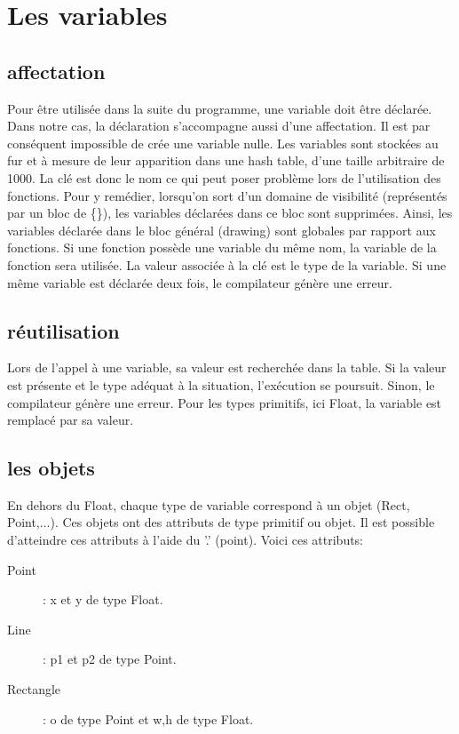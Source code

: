 \documentclass[11pt]{report} %
\begin{document}
\section{Les variables}

\subsection{affectation}

Pour être utilisée dans la suite du programme, une variable doit être déclarée. Dans notre cas, la déclaration s'accompagne aussi d'une affectation. Il est par conséquent impossible de crée une variable nulle. Les variables sont stockées au fur et à mesure de leur apparition dans une hash table, d'une taille arbitraire de 1000. La clé est donc le nom ce qui peut poser problème lors de l'utilisation des fonctions. Pour y remédier, lorsqu'on sort d'un domaine de visibilité (représentés par un bloc de  \{\}), les variables déclarées dans ce bloc sont supprimées. Ainsi, les variables déclarée dans le bloc général (drawing) sont globales par rapport aux fonctions. Si une fonction possède une variable du même nom, la variable de la fonction sera utilisée. La valeur associée à la clé est le type de la variable.
Si une même variable est déclarée deux fois, le compilateur génère une erreur. 

\subsection{réutilisation}

Lors de l'appel à une variable, sa valeur est recherchée dans la table. Si la valeur est présente et le type adéquat à la situation, l'exécution se poursuit. Sinon, le compilateur génère une erreur. Pour les types primitifs, ici Float, la variable est remplacé par sa valeur.

\subsection{les objets}

En dehors du Float, chaque type de variable correspond à un objet (Rect, Point,...). Ces objets ont des attributs de type primitif ou objet. Il est possible d'atteindre ces attributs à l'aide du '.' (point). Voici ces attributs:
\begin{description}
\item[Point]: x et y de type Float.
\item[Line]: p1 et p2 de type Point.
\item[Rectangle]: o de type Point et w,h de type Float.
\end{description}
\end{document}
